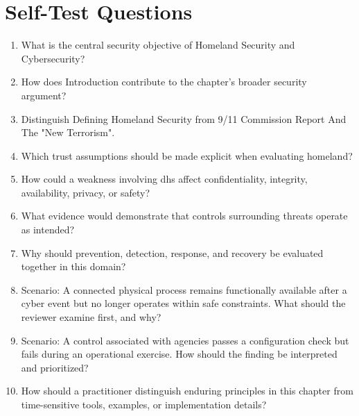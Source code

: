 \documentclass[11pt,letterpaper]{article}
\begin{document}
\section*{Self-Test Questions}
\begin{enumerate}
\item What is the central security objective of Homeland Security and Cybersecurity?
\item How does Introduction contribute to the chapter's broader security argument?
\item Distinguish Defining Homeland Security from 9/11 Commission Report And The "New Terrorism".
\item Which trust assumptions should be made explicit when evaluating homeland?
\item How could a weakness involving dhs affect confidentiality, integrity, availability, privacy, or safety?
\item What evidence would demonstrate that controls surrounding threats operate as intended?
\item Why should prevention, detection, response, and recovery be evaluated together in this domain?
\item Scenario: A connected physical process remains functionally available after a cyber event but no longer operates within safe constraints. What should the reviewer examine first, and why?
\item Scenario: A control associated with agencies passes a configuration check but fails during an operational exercise. How should the finding be interpreted and prioritized?
\item How should a practitioner distinguish enduring principles in this chapter from time-sensitive tools, examples, or implementation details?
\end{enumerate}
\end{document}
